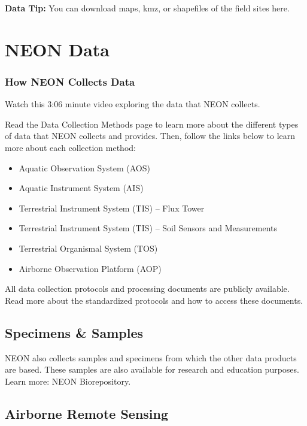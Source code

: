 \documentclass[]{book}
\providecommand{\tightlist}{%
  \setlength{\itemsep}{0pt}\setlength{\parskip}{0pt}}
\begin{document}
\leavevmode\hypertarget{ds-dataTip}{}%
 \textbf{Data Tip:} You can download
maps, kmz, or shapefiles of the field sites here.

\hypertarget{neon-data}{%
\section{NEON Data}\label{neon-data}}

\hypertarget{how-neon-collects-data}{%
\subsubsection{How NEON Collects Data}\label{how-neon-collects-data}}

Watch this 3:06 minute video exploring the data that NEON collects.

Read the
 Data Collection Methods
page to learn more about the different types of data that NEON collects and
provides. Then, follow the links below to learn more about each collection method:

\begin{itemize}
\tightlist
\item
  Aquatic Observation System (AOS) 
\item
  Aquatic Instrument System (AIS) 
\item
   Terrestrial Instrument System (TIS) -- Flux Tower 
\item
   Terrestrial Instrument System (TIS) -- Soil Sensors and Measurements 
\item
   Terrestrial Organismal System (TOS) 
\item
   Airborne Observation Platform (AOP) 
\end{itemize}

All data collection protocols and processing documents are publicly available.
Read more about the standardized protocols and how to access these documents.

\hypertarget{specimens-samples}{%
\subsection{Specimens \& Samples}\label{specimens-samples}}

NEON also collects samples and specimens from which the other data products are
based. These samples are also available for research and education purposes. Learn
more:
 NEON Biorepository.

\hypertarget{airborne-remote-sensing}{%
\subsection{Airborne Remote Sensing}\label{airborne-remote-sensing}}
\end{document}
